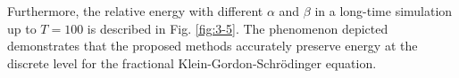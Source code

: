 \documentclass[preprint,compress,3p,10pt,fleqn]{elsarticle}
\numberwithin{equation}{section}
\begin{document}
Furthermore, the relative energy with different $\alpha$ and $\beta$ in a long-time simulation up to $T=100$ is described in Fig. \ref{fig:3-5}.
The phenomenon depicted demonstrates that the proposed methods accurately preserve energy at the discrete level for the fractional Klein-Gordon-Schr{\"o}dinger equation.
\begin{figure}[H]
\begin{center}
\\
\end{center}
\end{figure}
\end{document}
